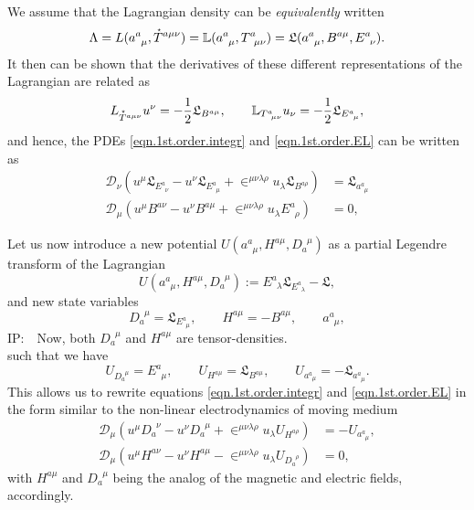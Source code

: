 \documentclass[
10pt, %
a4paper, %
oneside, %
headinclude,footinclude, %
BCOR5mm, %
]{scrartcl}
\newcommand{\IP}[1]{{\color{Red}IP:\ \ #1}}
\newcommand{\tetr}[2]{a^{#1}_{\phantom{#1}#2}}
\newcommand{\D}[1]{\mathcal{D}_{#1}} %
\newcommand{\Tors}[2]{T^{#1}_{\phantom{a}#2}}
\newcommand{\ET}[2]{E^{#1}_{\phantom{#1}#2}}	%
\newcommand{\eT}[2]{D_{#1}^{\phantom{#1}#2}}	%
\newcommand{\BT}[2]{B^{#1#2}}	%
\newcommand{\hT}[2]{H^{#1#2}}	%
\newcommand{\Laghodge}{L}%
\newcommand{\Lagtors}{\mathbb{L}}%
\newcommand{\LagBE}{\mathfrak{L}}%
\newcommand{\LCsymb}{\bm{\in}}    %
\newcommand{\HT}[1]{\accentset{\star}{T}^{#1}}
\begin{document}
We assume that the Lagrangian density can be \textit{equivalently} written 
\begin{equation}
\Lambda = \Laghodge(\tetr{a}{\mu},\HT{a\mu\nu}) = \Lagtors(\tetr{a}{\mu},\Tors{a}{\mu\nu}) = 
\LagBE(\tetr{a}{\mu},\BT{a}{\mu},\ET{a}{\nu}).
\end{equation}
It then can be shown that the derivatives of these different representations of the Lagrangian are related as
\begin{equation}
\Laghodge_{\HT{a\mu\nu}}u^\nu = -\frac12\LagBE_{\BT{a}{\mu}}, 
\qquad 
\Lagtors_{\Tors{a}{\mu\nu}}u_\nu = -\frac12\LagBE_{\ET{a}{\mu}},
\end{equation}
and hence, the PDEs \eqref{eqn.1st.order.integr} and \eqref{eqn.1st.order.EL} can be written as 
\begin{subequations}\label{eqn.tors.BE}
	\begin{align}
		\D{\nu}(u^\mu \LagBE_{\ET{a}{\nu}} - u^\nu\LagBE_{\ET{a}{\mu}} + 
		\LCsymb^{\mu\nu\lambda\rho}u_\lambda\LagBE_{\BT{a}{\rho}}) 
		&=\LagBE_{\tetr{a}{\mu}} \\[2mm]
%		
		\D{\mu}(u^\mu \BT{a}{\nu} - u^\nu\BT{a}{\mu} + 
		\LCsymb^{\mu\nu\lambda\rho}u_\lambda\ET{a}{\rho}) &= 0,
	\end{align}
\end{subequations}

Let us now introduce a new potential $ U(\tetr{a}{\mu},\hT{a}{\mu},\eT{a}{\mu}) $ as a partial 
Legendre transform of the Lagrangian
\begin{equation}
 U(\tetr{a}{\mu},\hT{a}{\mu},\eT{a}{\mu}) := \ET{a}{\lambda}\LagBE_{\ET{a}{\lambda}} - \LagBE,
\end{equation}
and new state variables
\begin{equation}
\eT{a}{\mu} = \LagBE_{\ET{a}{\mu}}, \qquad \hT{a}{\mu} = -\BT{a}{\mu}, \qquad \tetr{a}{\mu},
\end{equation}
\IP{Now, both $ \eT{a}{\mu} $ and $ \hT{a}{\mu} $ are tensor-densities.}\\
such that we have
\begin{equation}
U_{\eT{a}{\mu}} = \ET{a}{\mu}, \qquad U_{\hT{a}{\mu}} = \LagBE_{\BT{a}{\mu}},
\qquad U_{\tetr{a}{\mu}} = - \LagBE_{\tetr{a}{\mu}}.
\end{equation}
This allows us to rewrite equations \eqref{eqn.1st.order.integr} and \eqref{eqn.1st.order.EL} in 
the form similar to the non-linear 
electrodynamics of moving medium~\cite{Obukhov2008,DPRZ2017,Hohmann2018a}
\begin{subequations}
	\begin{align}
		\D{\mu}(u^\mu\eT{a}{\nu} - u^\nu\eT{a}{\mu} + 
		\LCsymb^{\mu\nu\lambda\rho}u_\lambda 
		U_{\hT{a}{\rho}})
		& =-U_{\tetr{a}{\mu}},\\[2mm]
		\D{\mu}(u^\mu \hT{a}{\nu} - u^\nu\hT{a}{\mu} - 
		\LCsymb^{\mu\nu\lambda\rho}u_\lambda 
		U_{\eT{a}{\rho}}) 
		& = 0,
\end{align}
\end{subequations}
with $\hT{a}{\mu}$ and $\eT{a}{\mu}$ being the analog of the magnetic and electric fields, 
accordingly.
\end{document}
